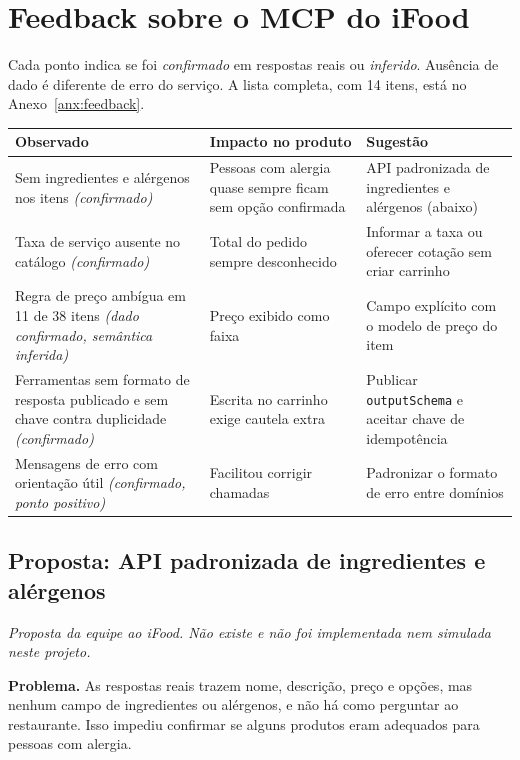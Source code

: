 \documentclass[11pt,a4paper]{article}
\begin{document}
\section{Feedback sobre o MCP do iFood}\label{sec:feedback}

Cada ponto indica se foi \emph{confirmado} em respostas reais ou \emph{inferido}. Ausência de dado é diferente de erro do serviço. A lista completa, com 14 itens, está no Anexo~\ref{anx:feedback}.

\begin{center}
\small
\begin{tabularx}{\linewidth}{>{\raggedright}p{3.6cm}YY}
\toprule
\textbf{Observado} & \textbf{Impacto no produto} & \textbf{Sugestão} \\
\midrule
Sem ingredientes e alérgenos nos itens \emph{(confirmado)} & Pessoas com alergia quase sempre ficam sem opção confirmada & API padronizada de ingredientes e alérgenos (abaixo) \\
Taxa de serviço ausente no catálogo \emph{(confirmado)} & Total do pedido sempre desconhecido & Informar a taxa ou oferecer cotação sem criar carrinho \\
Regra de preço ambígua em 11 de 38 itens \emph{(dado confirmado, semântica inferida)} & Preço exibido como faixa & Campo explícito com o modelo de preço do item \\
Ferramentas sem formato de resposta publicado e sem chave contra duplicidade \emph{(confirmado)} & Escrita no carrinho exige cautela extra & Publicar \texttt{outputSchema} e aceitar chave de idempotência \\
Mensagens de erro com orientação útil \emph{(confirmado, ponto positivo)} & Facilitou corrigir chamadas & Padronizar o formato de erro entre domínios \\
\bottomrule
\end{tabularx}
\end{center}

\subsection{Proposta: API padronizada de ingredientes e alérgenos}
\emph{Proposta da equipe ao iFood. Não existe e não foi implementada nem simulada neste projeto.}

\textbf{Problema.} As respostas reais trazem nome, descrição, preço e opções, mas nenhum campo de ingredientes ou alérgenos, e não há como perguntar ao restaurante. Isso impediu confirmar se alguns produtos eram adequados para pessoas com alergia.
\end{document}
